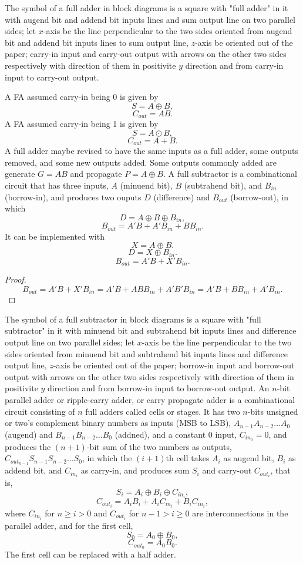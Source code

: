 \documentclass[a4paper,12pt]{report}
\begin{document}
The symbol of a full adder in block diagrams is a square with "full adder" in it with augend bit and addend bit inputs lines and sum output line on two parallel sides; let $x$-axis be the line perpendicular to the two sides oriented from augend bit and addend bit inputs lines to sum output line, $z$-axis be oriented out of the paper; carry-in input and carry-out output with arrows on the other two sides respectively with direction of them in positivite $y$ direction and from carry-in input to carry-out output.

A FA assumed carry-in being 0 is given by
\[S=A\oplus B,\]
\[C_{out}=AB.\]
A FA assumed carry-in being 1 is given by
\[S=A\odot B,\]
\[C_{out}=A+B.\]
A full adder maybe revised to have the same inputs as a full adder, some outputs removed, and some new outputs added. Some outputs commonly added are generate $G=AB$ and propagate $P=A\oplus B$.
A full subtractor is a combinational circuit that has three inputs, $A$ (minuend bit), $B$ (subtrahend bit), and $B_{in}$ (borrow-in), and produces two ouputs $D$ (difference) and $B_{out}$ (borrow-out), in which
\[D=A\oplus B\oplus B_{in},\]
\[B_{out}=A'B+A'B_{in}+BB_{in}.\]
It can be implemented with
\[X=A\oplus B.\]
\[D=X\oplus B_{in}.\]
\[B_{out}=A'B+X'B_{in}.\]
\begin{proof}
\[B_{out}=A'B+X'B_{in}=A'B+ABB_{in}+A'B'B_{in}=A'B+BB_{in}+A'B_{in}.\]
\end{proof}

The symbol of a full subtractor in block diagrams is a square with "full subtractor" in it with minuend bit and subtrahend bit inputs lines and difference output line on two parallel sides; let $x$-axis be the line perpendicular to the two sides oriented from minuend bit and subtrahend bit inputs lines and difference output line, $z$-axis be oriented out of the paper; borrow-in input and borrow-out output with arrows on the other two sides respectively with direction of them in positivite $y$ direction and from borrow-in input to borrow-out output.
An $n$-bit parallel adder or ripple-carry adder, or carry propagate adder is a combinational circuit consisting of $n$ full adders called cells or stages. It has two $n$-bits unsigned or two's complement binary numbers as inputs (MSB to LSB), $A_{n-1}A_{n-2}\ldots A_0$ (augend) and $B_{n-1}B_{n-2}\ldots B_0$ (addned), and a constant $0$ input, $C_{in_0}=0$, and produces the $(n+1)$-bit sum of the two numbers as outputs, $C_{out_{n-1}}S_{n-1}S_{n-2}\ldots S_0$, in which the $(i+1)$th cell takes $A_i$ as augend bit, $B_i$ as addend bit, and $C_{in_i}$ as carry-in, and produces sum $S_i$ and carry-out $C_{out_i}$, that is,
\[S_i=A_i\oplus B_i\oplus C_{in_i},\]
\[C_{out_i}=A_iB_i+A_iC_{in_i}+B_iC_{in_i},\]
where $C_{in_i}$ for $n\geq i>0$ and $C_{out_i}$ for $n-1>i\geq 0$ are interconnections in the parallel adder, and for the first cell,
\[S_0=A_0\oplus B_0,\]
\[C_{out_0}=A_0B_0.\]
The first cell can be replaced with a half adder.
\end{document}
